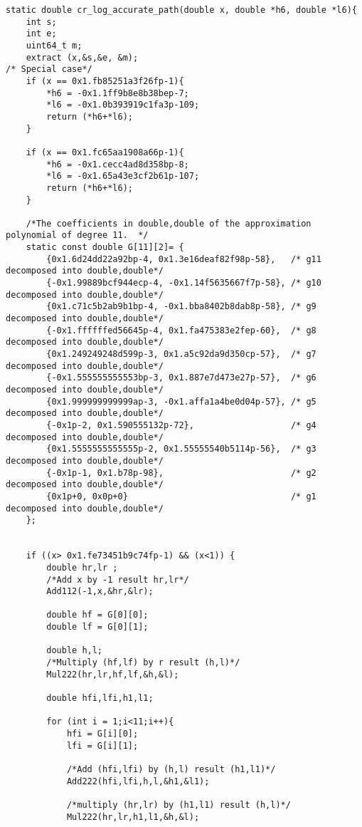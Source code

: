 \begin{lstlisting}
static double cr_log_accurate_path(double x, double *h6, double *l6){
    int s;
    int e;
    uint64_t m;
    extract (x,&s,&e, &m);
/* Special case*/
    if (x == 0x1.fb85251a3f26fp-1){
        *h6 = -0x1.1ff9b8e8b38bep-7;
        *l6 = -0x1.0b393919c1fa3p-109;
        return (*h6+*l6);
    }

    if (x == 0x1.fc65aa1908a66p-1){
        *h6 = -0x1.cecc4ad8d358bp-8;
        *l6 = -0x1.65a43e3cf2b61p-107;
        return (*h6+*l6);
    }

    /*The coefficients in double,double of the approximation polynomial of degree 11.  */
    static const double G[11][2]= {
        {0x1.6d24dd22a92bp-4, 0x1.3e16deaf82f98p-58},   /* g11 decomposed into double,double*/
        {-0x1.99889bcf944ecp-4, -0x1.14f5635667f7p-58}, /* g10 decomposed into double,double*/       
        {0x1.c71c5b2ab9b1bp-4, -0x1.bba8402b8dab8p-58}, /* g9 decomposed into double,double*/
        {-0x1.ffffffed56645p-4, 0x1.fa475383e2fep-60},  /* g8 decomposed into double,double*/
        {0x1.249249248d599p-3, 0x1.a5c92da9d350cp-57},  /* g7 decomposed into double,double*/
        {-0x1.555555555553bp-3, 0x1.887e7d473e27p-57},  /* g6 decomposed into double,double*/
        {0x1.999999999999ap-3, -0x1.affa1a4be0d04p-57}, /* g5 decomposed into double,double*/
        {-0x1p-2, 0x1.590555132p-72},                   /* g4 decomposed into double,double*/
        {0x1.5555555555555p-2, 0x1.55555540b5114p-56},  /* g3 decomposed into double,double*/
        {-0x1p-1, 0x1.b78p-98},                         /* g2 decomposed into double,double*/
        {0x1p+0, 0x0p+0}                                /* g1 decomposed into double,double*/
    };  

    
    if ((x> 0x1.fe73451b9c74fp-1) && (x<1)) {
        double hr,lr ;
        /*Add x by -1 result hr,lr*/
        Add112(-1,x,&hr,&lr);
       
        double hf = G[0][0];
        double lf = G[0][1];
        
        double h,l;
        /*Multiply (hf,lf) by r result (h,l)*/
        Mul222(hr,lr,hf,lf,&h,&l);
        
        double hfi,lfi,h1,l1;

        for (int i = 1;i<11;i++){
            hfi = G[i][0];
            lfi = G[i][1];

            /*Add (hfi,lfi) by (h,l) result (h1,l1)*/
            Add222(hfi,lfi,h,l,&h1,&l1);

            /*multiply (hr,lr) by (h1,l1) result (h,l)*/
            Mul222(hr,lr,h1,l1,&h,&l);
            

\end{lstlisting}

